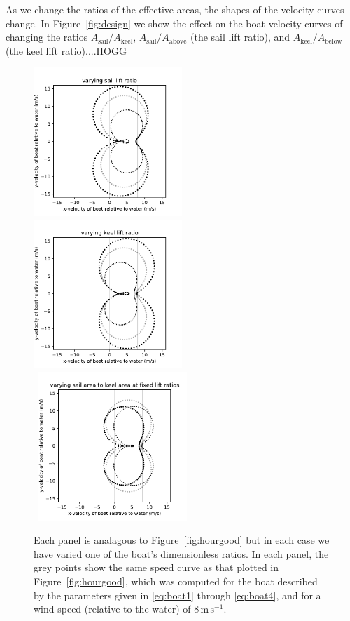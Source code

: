 \documentclass[letterpaper]{article}
\newcommand{\sail}{\text{sail}}
\newcommand{\keel}{\text{keel}}
\renewcommand{\above}{\text{above}}
\newcommand{\below}{\text{below}}
\newcommand{\mps}{\mathrm{m\,s^{-1}}}
\newcommand{\figref}[1]{Figure~\ref{#1}}
\begin{document}
As we change the ratios of the effective areas, the shapes of the velocity curves change.
In \figref{fig:design} we show the effect on the boat velocity curves of changing the ratios $A_\sail/A_\keel$, $A_\sail/A_\above$ (the sail lift ratio), and $A_\keel/A_\below$ (the keel lift ratio)....HOGG
\begin{figure}[t!]
  \includegraphics[width=0.5\textwidth]{design_A.pdf}%
  \includegraphics[width=0.5\textwidth]{design_C.pdf}\\%
  ~\hfill\includegraphics[width=0.5\textwidth]{design_E.pdf}\hfill~
  \caption{Each panel is analagous to \figref{fig:hourgood} but in each case we have varied one of the boat's dimensionless ratios. In each panel, the grey points show the same speed curve as that plotted in \figref{fig:hourgood}, which was computed for the boat described by the parameters given in \eqref{eq:boat1} through \eqref{eq:boat4}, and for a wind speed (relative to the water) of $8\,\mps$.
}
\end{figure}
\end{document}
